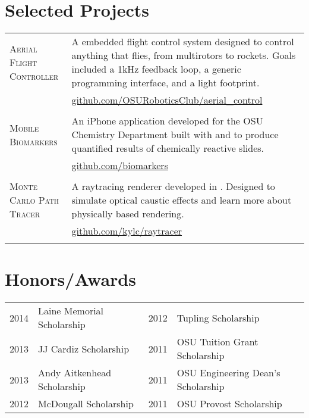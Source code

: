 \documentclass[10pt]{article}
\begin{document}
\newcommand{\proj}[3]{
  \nohyphens{\textsc{#1}} & #2\\
   &\href{http://www.#3}{#3}\\
   \multicolumn{2}{c}{} \\ [-1ex]
}

\newcommand{\projl}[3]{
  \textsc{#1} & #2\\
   &\href{http://www.#3}{#3}\\
}

\newcommand{\projlh}[4]{
  \textsc{#1} & #2\\
   &\href{#3}{#4}\\
}
\section{Selected Projects}
\begin{tabularx}{\textwidth}{@{}p{2.2cm}|X@{}}
  \proj{Aerial Flight Controller}
  {A \skill{C++} embedded flight control system designed to control anything
  that flies, from multirotors to rockets. Goals included a 1kHz feedback loop,
  a generic programming interface, and a light footprint.
  }
  {github.com/OSURoboticsClub/aerial\_control}

  \proj{Mobile Biomarkers}
  {An iPhone application developed for the OSU Chemistry Department built with
  \skill{Objective-C} and \skill{C++} to produce quantified results of
  chemically reactive slides.}
  {github.com/biomarkers}

  \proj{Monte Carlo Path Tracer}
  {A raytracing renderer developed in \skill{Rust}. Designed to simulate optical
  caustic effects and learn more about physically based rendering.}
  {github.com/kylc/raytracer}

\end{tabularx}

\section{Honors/Awards}
\begin{tabularx}{\textwidth}{@{}r|X l|l@{}}
2014 & Laine Memorial Scholarship &
2012 & Tupling Scholarship \\

2013 & JJ Cardiz Scholarship &
2011 & OSU Tuition Grant Scholarship \\

2013 & Andy Aitkenhead Scholarship &
2011 & OSU Engineering Dean's Scholarship \\

2012 & McDougall Scholarship &
2011 & OSU Provost Scholarship \\
\end{tabularx}


% 
\end{document}
